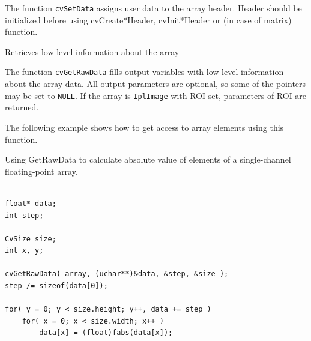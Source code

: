 
\begin{description}
\end{description}


The function \texttt{cvSetData} assigns user data to the array header. Header should be initialized before using cvCreate*Header, cvInit*Header or  (in case of matrix) function.

\label{GetRawData}

Retrieves low-level information about the array


\begin{description}
\end{description}

The function \texttt{cvGetRawData} fills output variables with low-level information about the array data. All output parameters are optional, so some of the pointers may be set to \texttt{NULL}. If the array is \texttt{IplImage} with ROI set, parameters of ROI are returned.

The following example shows how to get access to array elements using this function.

Using GetRawData to calculate absolute value of elements of a single-channel floating-point array.

\begin{lstlisting}

float* data;
int step;

CvSize size;
int x, y;

cvGetRawData( array, (uchar**)&data, &step, &size );
step /= sizeof(data[0]);

for( y = 0; y < size.height; y++, data += step )
    for( x = 0; x < size.width; x++ )
        data[x] = (float)fabs(data[x]);

\end{lstlisting}


